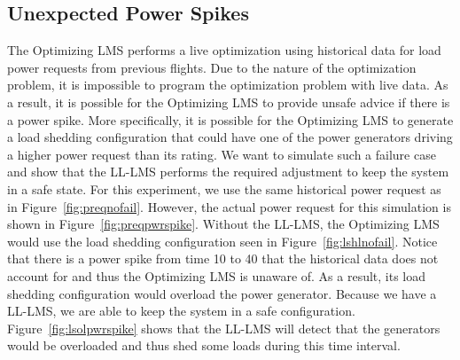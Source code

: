 \documentclass{acm_proc_article-sp}
\begin{document}
\subsection{Unexpected Power Spikes}
\label{sec:power-spikes-simulation}
The Optimizing LMS performs a live optimization using historical data for load power requests from previous flights. 
Due to the nature of the optimization problem, it is impossible to program the optimization problem with live data. 
As a result, it is possible for the Optimizing LMS to provide unsafe advice if there is a power spike. 
More specifically, it is possible for the Optimizing LMS to generate a load shedding configuration that could have one of the power generators driving a higher power request than its rating. We want to simulate such a failure case and show that the LL-LMS performs the required adjustment to keep the system in a safe state. 
For this experiment, we use the same historical power request as in Figure~\ref{fig:preqnofail}. 
However, the actual power request for this simulation is shown in Figure~\ref{fig:preqpwrspike}. 
Without the LL-LMS, the Optimizing LMS would use the load shedding configuration seen in Figure~\ref{fig:lshlnofail}. 
Notice that there is a power spike from time 10 to 40 that the historical data does not account for and thus the Optimizing LMS is unaware of. 
As a result, its load shedding configuration would overload the power generator. 
Because we have a LL-LMS, we are able to keep the system in a safe configuration.
Figure~\ref{fig:lsolpwrspike} shows that the LL-LMS will detect that the generators would be overloaded and thus shed some loads during this time interval.
\end{document}
